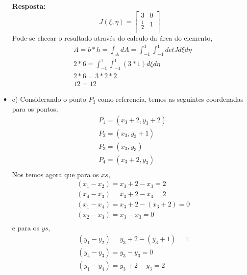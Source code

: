 \begin{itemize}
	\color{blue}
	\textbf{Resposta:}
	\begin{equation}
	J(\xi, \eta) = 
	\begin{bmatrix}
		3 & 0\\
		\frac{1}{2} & 1\\
	\end{bmatrix}
	\end{equation}	
	\color{black}
	Pode-se checar o resultado através do calculo da área do elemento,
	\begin{equation}
		\begin{split}
		& A = b * h = \int_A dA = \int_{-1}^1 \int_{-1}^1 det J d\xi d\eta\\
		& 2 * 6 = \int_{-1}^1 \int_{-1}^1 \left(3 * 1\right)  d\xi d\eta\\
		& 2 * 6 = 3 * 2 * 2 \\
		& 12 = 12		
		\end{split}
	\end{equation}
	\item c)
	Considerando o ponto $P_3$ como referencia, temos as seguintes coordenadas para os pontos,
	\begin{equation}
		\begin{split}
			&	P_1 = (x_3 + 2, y_3 + 2)\\
			&	P_2 = (x_3    , y_3 + 1)\\
			&	P_3 = (x_3    , y_3    )\\
			&	P_4 = (x_3 + 2, y_3    )\\
		\end{split}
	\end{equation}
	Nos temos agora que para os $xs$,
	\begin{equation}
		\begin{split}
			&	(x_1 - x_2) = x_3 + 2 - x_3 = 2 \\
			&	(x_4 - x_3) = x_3 + 2 - x_3 = 2\\
			&	(x_1 - x_4) = x_3 + 2 - (x_3 + 2) = 0\\\
			&	(x_2 - x_3) = x_3  - x_3 = 0\\
		\end{split}
	\end{equation}
	e para os $ys$,
	\begin{equation}
		\begin{split}
			&	(y_1 - y_2) = y_3 + 2 - (y_3 + 1) = 1 \\
			&	(y_4 - y_3) = y_3 - y_3 = 0\\
			&	(y_1 - y_4) = y_3 + 2 - y_3 = 2\\\

\end{split}
\end{equation}
\end{itemize}
